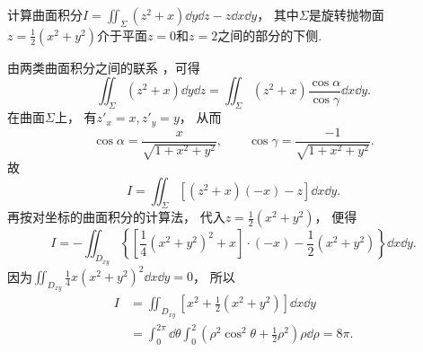\begin{example}
计算曲面积分\(I=\iint_\Sigma (z^2+x) \dd{y}\dd{z} - z \dd{x}\dd{y}\)，
其中\(\Sigma\)是旋转抛物面\(z = \frac{1}{2}(x^2+y^2)\)介于平面\(z=0\)和\(z=2\)之间的部分的下侧.
\begin{solution}
由两类曲面积分之间的联系 ，可得\[
	\iint_\Sigma (z^2+x) \dd{y}\dd{z}
	= \iint_\Sigma (z^2+x) \frac{\cos\alpha}{\cos\gamma} \dd{x}\dd{y}.
\]
在曲面\(\Sigma\)上，
有\(z'_x = x, z'_y = y\)，
从而\[
	\cos\alpha
	= \frac{x}{\sqrt{1+x^2+y^2}},
	\qquad
	\cos\gamma
	= \frac{-1}{\sqrt{1+x^2+y^2}}.
\]
故\[
	I = \iint_\Sigma [(z^2+x)(-x) - z] \dd{x}\dd{y}.
\]
再按对坐标的曲面积分的计算法，
代入\(z = \frac{1}{2}(x^2+y^2)\)，
便得\[
	I = - \iint_{D_{xy}} \left\{
		\left[
			\frac{1}{4} (x^2+y^2)^2
			+ x
		\right] \cdot (-x)
		- \frac{1}{2} (x^2+y^2)
	\right\} \dd{x}\dd{y}.
\]
因为\(\iint_{D_{xy}} \frac{1}{4} x(x^2+y^2)^2 \dd{x}\dd{y} = 0\)，
所以\begin{align*}
	I
	&= \iint_{D_{xy}} \left[x^2+\frac{1}{2}(x^2+y^2)\right] \dd{x}\dd{y} \\
	&= \int_0^{2\pi} \dd{\theta}
		\int_0^2 \left(\rho^2 \cos^2\theta + \frac{1}{2} \rho^2\right) \rho \dd{\rho}
	= 8\pi.
\end{align*}
\end{solution}
\end{example}
